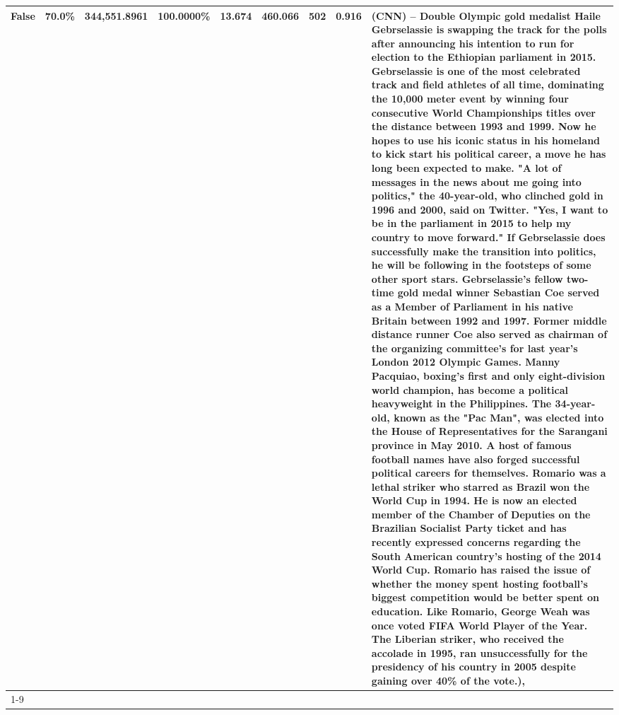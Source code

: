\begin{table}[H]
{\begin{tabular}{lllrlllll}
False & 70.0\% & 344,551.8961 & \bfseries \color{red} 100.0000\% & 13.674 & 460.066 & 502 & 0.916 & (CNN) -- Double Olympic gold medalist Haile Gebrselassie is swapping the track for the polls after announcing his intention to run for election to the Ethiopian parliament in 2015. Gebrselassie is one of the most celebrated track and field athletes of all time, dominating the 10,000 meter event by winning four consecutive World Championships titles over the distance between 1993 and 1999. Now he hopes to use his iconic status in his homeland to kick start his political career, a move he has long been expected to make. "A lot of messages in the news about me going into politics," the 40-year-old, who clinched gold in 1996 and 2000, said on Twitter. "Yes, I want to be in the parliament in 2015 to help my country to move forward." If Gebrselassie does successfully make the transition into politics, he will be following in the footsteps of some other sport stars. Gebrselassie's fellow two-time gold medal winner Sebastian Coe served as a Member of Parliament in his native Britain between 1992 and 1997. Former middle distance runner Coe also served as chairman of the organizing committee's for last year's London 2012 Olympic Games. Manny Pacquiao, boxing's first and only eight-division world champion, has become a political heavyweight in the Philippines. The 34-year-old, known as the "Pac Man", was elected into the House of Representatives for the Sarangani province in May 2010. A host of famous football names have also forged successful political careers for themselves. Romario was a lethal striker who starred as Brazil won the World Cup in 1994. He is now an elected member of the Chamber of Deputies on the Brazilian Socialist Party ticket and has recently expressed concerns regarding the South American country's hosting of the 2014 World Cup. Romario has raised the issue of whether the money spent hosting football's biggest competition would be better spent on education. Like Romario, George Weah was once voted FIFA World Player of the Year. The Liberian striker, who received the accolade in 1995, ran unsuccessfully for the presidency of his country in 2005 despite gaining over 40\% of the vote.), \\
\cline{1-9}

\end{tabular}}
\end{table}
